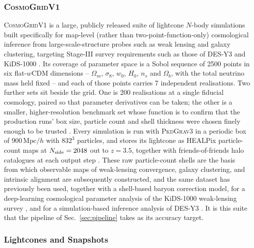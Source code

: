 \documentclass{report}
\begin{document}
\subsubsection{\textsc{CosmoGridV1}}
\label{sec:cosmogrid}

\textsc{CosmoGridV1} is a large, publicly released suite of lightcone $N$-body simulations built specifically for map-level (rather than two-point-function-only) cosmological inference from large-scale-structure probes such as weak lensing and galaxy clustering, targeting Stage-III survey requirements such as those of DES-Y3 and KiDS-1000 \cite{kacprzak_cosmogridv1_2023, thomsen_dark_2026}. Its coverage of parameter space is a Sobol sequence of 2500 points in six flat-\mbox{$w$}CDM dimensions -- \mbox{$\Omega_m$}, \mbox{$\sigma_8$}, \mbox{$w_0$}, \mbox{$H_0$}, \mbox{$n_s$} and \mbox{$\Omega_b$}, with the total neutrino mass held fixed -- and each of those points carries 7 independent realisations. Two further sets sit beside the grid. One is 200 realisations at a single fiducial cosmology, paired so that parameter derivatives can be taken; the other is a smaller, higher-resolution benchmark set whose function is to confirm that the production runs' box size, particle count and shell thickness were chosen finely enough to be trusted \cite{kacprzak_cosmogridv1_2023}. Every simulation is run with \textsc{PkdGrav3} in a periodic box of $900\,\mathrm{Mpc}/h$ with $832^3$ particles, and stores its lightcone as HEALPix particle-count maps at $N_{\rm side}=2048$ out to $z=3.5$, together with friends-of-friends halo catalogues at each output step \cite{kacprzak_cosmogridv1_2023}. These raw particle-count shells are the basis from which observable maps of weak-lensing convergence, galaxy clustering, and intrinsic alignment are subsequently constructed, and the same dataset has previously been used, together with a shell-based baryon correction model, for a deep-learning cosmological parameter analysis of the KiDS-1000 weak-lensing survey \cite{fluri_full_2022}, and for a simulation-based inference analysis of DES-Y3 \cite{thomsen_dark_2026}. It is this suite that the pipeline of Sec.~\ref{sec:pipeline} takes as its accuracy target.


\subsubsection{Lightcones and Snapshots}
\label{sec:lightcones}
\end{document}
